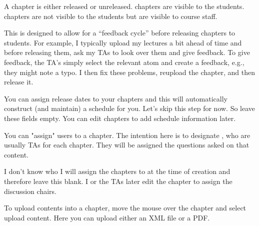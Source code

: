 \begin{gram}
A chapter is either released or unreleased. 
%
 chapters are visible to the students.
%
 chapters are not visible to the students but  are visible to course staff.  

This is designed to allow for a ``feedback cycle'' before releasing chapters to students.  
%
For example, I typically  upload my lectures a bit ahead of time and before releasing them, ask my TAs to look over them and give feedback.
%
To give feedback, the TA's simply select the relevant atom and create a feedback, e.g., they might note a typo.
%
I then fix these problems, reupload the chapter, and then release it.  
\end{gram}

\begin{gram}  
You can assign release dates to your chapters and this will
automatically construct (and maintain) a schedule for you.  Let's skip
this step for now.  So leave these fields empty.  You can edit
chapters to add schedule information later.
\end{gram}


\begin{gram}
You can "assign" users to a chapter.  The intention here is to
designate , who are usually TAs for each
chapter. 
%
They will be assigned the questions asked on that content.

I don't know who I will assign the chapters to at the time of creation and therefore leave this blank.  I or the TAs later edit the chapter to assign the discussion chairs. 
\end{gram}

\begin{gram}
\label{guide:chapter::upload::window}
To upload contents into a chapter, move the mouse over the chapter and
select upload content.  Here you can upload either an XML
file or a PDF.  
\end{gram}

